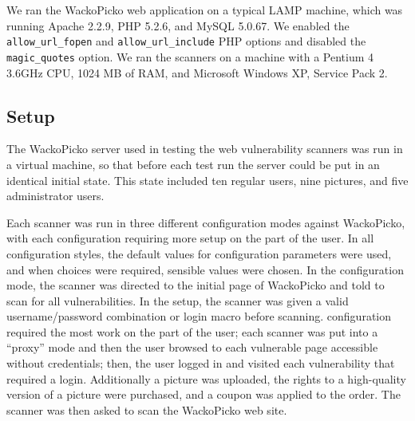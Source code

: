 We ran the WackoPicko web application on a typical LAMP machine, which was running
Apache 2.2.9, PHP 5.2.6, and MySQL 5.0.67. We enabled the {\tt
allow\_\-url\_\-fopen} and {\tt allow\_\-url\_\-include}  PHP options and disabled the  {\tt magic\_\-quotes} option.
We ran the scanners on a machine with a Pentium 4 3.6GHz CPU, 1024 MB of
RAM, and Microsoft Windows XP, Service Pack 2.
%

\subsection{Setup}
The WackoPicko server used in testing the web vulnerability scanners was run in a virtual
machine, so that before each test run the server could be put in an
identical initial state. This state included ten regular users, nine pictures,
and five administrator users.

Each scanner was run in three different configuration modes against
WackoPicko, with each configuration requiring more setup on the part of the
user. In all configuration styles, the default values for configuration parameters were used, and when choices
were required, sensible values were chosen. In the \initial{}
configuration mode, the scanner was
directed to the initial page of WackoPicko and told to scan for all
vulnerabilities. In the \config{} setup, the scanner was given a valid
username/password combination or login macro before scanning. 
\manual{} configuration required the most
work on the part of the user; each scanner was put into a ``proxy'' mode
and then the user browsed to each vulnerable page accessible without credentials; then, the user
logged in and visited each vulnerability that required a login.
Additionally a picture was uploaded, the rights to a high-quality version
of a picture were purchased, and a coupon was applied to the order. The
scanner was then asked to scan the WackoPicko web site.

